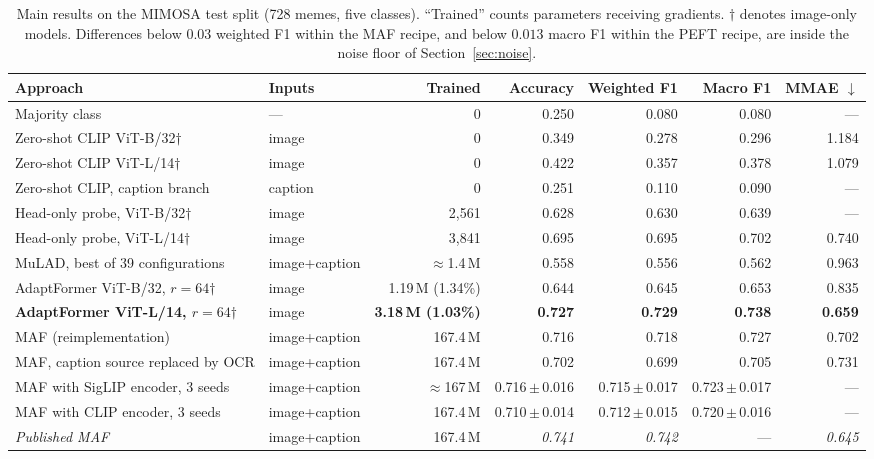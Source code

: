 \documentclass[conference]{IEEEtran}
\begin{document}
\begin{table}[t]
\caption{Main results on the MIMOSA test split (728 memes, five classes). ``Trained''
counts parameters receiving gradients. $\dagger$ denotes image-only models.
Differences below $0.03$ weighted F1 within the MAF recipe, and below $0.013$
macro F1 within the PEFT recipe, are inside the noise floor of
Section~\ref{sec:noise}.}
\label{tab:main}
\centering
\small
\begin{tabular}{llrrrrr}
\toprule
Approach & Inputs & Trained & Accuracy & Weighted F1 & Macro F1 & MMAE $\downarrow$ \\
\midrule
Majority class                            & ---            & 0          & 0.250 & 0.080 & 0.080 & --- \\
Zero-shot CLIP ViT-B/32$\dagger$          & image          & 0          & 0.349 & 0.278 & 0.296 & 1.184 \\
Zero-shot CLIP ViT-L/14$\dagger$          & image          & 0          & 0.422 & 0.357 & 0.378 & 1.079 \\
Zero-shot CLIP, caption branch            & caption        & 0          & 0.251 & 0.110 & 0.090 & --- \\
\midrule
Head-only probe, ViT-B/32$\dagger$        & image          & 2{,}561    & 0.628 & 0.630 & 0.639 & --- \\
Head-only probe, ViT-L/14$\dagger$        & image          & 3{,}841    & 0.695 & 0.695 & 0.702 & 0.740 \\
\midrule
MuLAD, best of 39 configurations          & image+caption  & $\approx$1.4\,M & 0.558 & 0.556 & 0.562 & 0.963 \\
AdaptFormer ViT-B/32, $r{=}64$$\dagger$   & image          & 1.19\,M (1.34\%) & 0.644 & 0.645 & 0.653 & 0.835 \\
\textbf{AdaptFormer ViT-L/14, $r{=}64$}$\dagger$ & image    & \textbf{3.18\,M (1.03\%)} & \textbf{0.727} & \textbf{0.729} & \textbf{0.738} & \textbf{0.659} \\
\midrule
MAF (reimplementation)                    & image+caption  & 167.4\,M   & 0.716 & 0.718 & 0.727 & 0.702 \\
MAF, caption source replaced by OCR       & image+caption  & 167.4\,M   & 0.702 & 0.699 & 0.705 & 0.731 \\
MAF with SigLIP encoder, 3 seeds          & image+caption  & $\approx$167\,M & 0.716\,$\pm$\,0.016 & 0.715\,$\pm$\,0.017 & 0.723\,$\pm$\,0.017 & --- \\
MAF with CLIP encoder, 3 seeds            & image+caption  & 167.4\,M   & 0.710\,$\pm$\,0.014 & 0.712\,$\pm$\,0.015 & 0.720\,$\pm$\,0.016 & --- \\
\midrule
\textit{Published MAF}~\cite{ahsan2024}   & image+caption  & 167.4\,M   & \textit{0.741} & \textit{0.742} & --- & \textit{0.645} \\
\bottomrule
\end{tabular}
\end{table}
\end{document}
